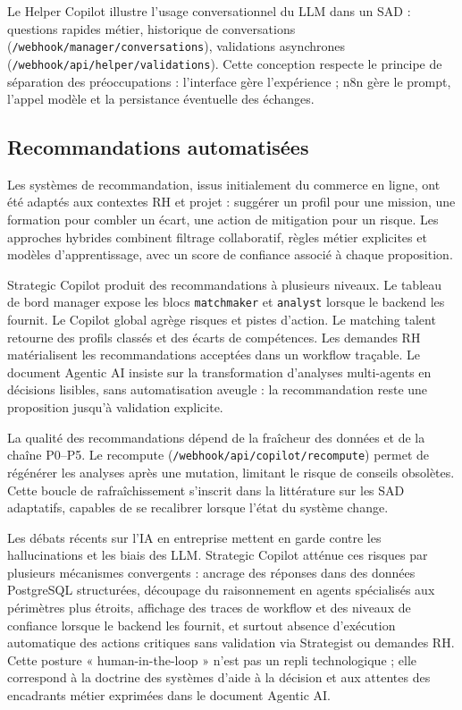 Le Helper Copilot illustre l'usage conversationnel du LLM dans un SAD : questions rapides métier, historique de conversations (\texttt{/webhook/manager/conversations}), validations asynchrones (\texttt{/webhook/api/helper/validations}). Cette conception respecte le principe de séparation des préoccupations : l'interface gère l'expérience ; n8n gère le prompt, l'appel modèle et la persistance éventuelle des échanges.

\subsection{Recommandations automatisées}

Les systèmes de recommandation, issus initialement du commerce en ligne, ont été adaptés aux contextes RH et projet : suggérer un profil pour une mission, une formation pour combler un écart, une action de mitigation pour un risque. Les approches hybrides combinent filtrage collaboratif, règles métier explicites et modèles d'apprentissage, avec un score de confiance associé à chaque proposition.

Strategic Copilot produit des recommandations à plusieurs niveaux. Le tableau de bord manager expose les blocs \texttt{matchmaker} et \texttt{analyst} lorsque le backend les fournit. Le Copilot global agrège risques et pistes d'action. Le matching talent retourne des profils classés et des écarts de compétences. Les demandes RH matérialisent les recommandations acceptées dans un workflow traçable. Le document Agentic AI insiste sur la transformation d'analyses multi-agents en décisions lisibles, sans automatisation aveugle : la recommandation reste une proposition jusqu'à validation explicite.

La qualité des recommandations dépend de la fraîcheur des données et de la chaîne P0--P5. Le recompute (\texttt{/webhook/api/copilot/recompute}) permet de régénérer les analyses après une mutation, limitant le risque de conseils obsolètes. Cette boucle de rafraîchissement s'inscrit dans la littérature sur les SAD adaptatifs, capables de se recalibrer lorsque l'état du système change.

Les débats récents sur l'IA en entreprise mettent en garde contre les hallucinations et les biais des LLM. Strategic Copilot atténue ces risques par plusieurs mécanismes convergents : ancrage des réponses dans des données PostgreSQL structurées, découpage du raisonnement en agents spécialisés aux périmètres plus étroits, affichage des traces de workflow et des niveaux de confiance lorsque le backend les fournit, et surtout absence d'exécution automatique des actions critiques sans validation via Strategist ou demandes RH. Cette posture « human-in-the-loop » n'est pas un repli technologique ; elle correspond à la doctrine des systèmes d'aide à la décision et aux attentes des encadrants métier exprimées dans le document Agentic AI.

